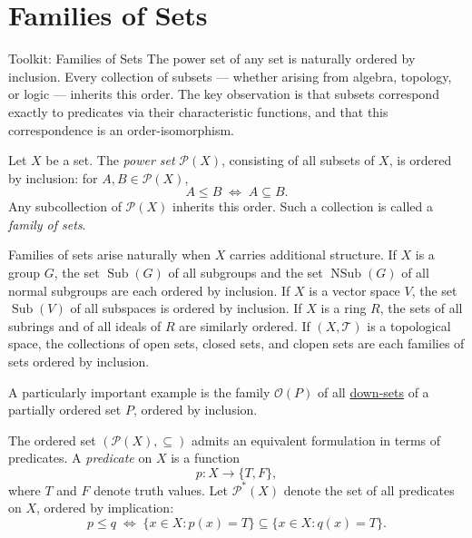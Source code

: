 
\section{Families of Sets}
\label{sec:families-of-sets}

\begin{toolkitbox}{Toolkit: Families of Sets}
The power set of any set is naturally ordered by inclusion.  Every
collection of subsets — whether arising from algebra, topology, or logic
— inherits this order.  The key observation is that subsets correspond
exactly to predicates via their characteristic functions, and that this
correspondence is an order-isomorphism.
\end{toolkitbox}

Let $X$ be a set.  The \emph{power set} $\mathcal{P}(X)$, consisting of
all subsets of $X$, is ordered by inclusion: for $A, B \in \mathcal{P}(X)$,
\[
A \leq B \;\Longleftrightarrow\; A \subseteq B.
\]
Any subcollection of $\mathcal{P}(X)$ inherits this order.  Such a
collection is called a \emph{family of sets}.

Families of sets arise naturally when $X$ carries additional structure.
If $X$ is a group $G$, the set $\operatorname{Sub}(G)$ of all subgroups
and the set $\operatorname{NSub}(G)$ of all normal subgroups are each
ordered by inclusion.  If $X$ is a vector space $V$, the set
$\operatorname{Sub}(V)$ of all subspaces is ordered by inclusion.  If $X$
is a ring $R$, the sets of all subrings and of all ideals of $R$ are
similarly ordered.  If $(X, \mathcal{T})$ is a topological space, the
collections of open sets, closed sets, and clopen sets are each families
of sets ordered by inclusion.

A particularly important example is the family $\mathcal{O}(P)$ of all
\hyperref[def:down-set]{down-sets} of a partially ordered set $P$,
ordered by inclusion.

\medskip

The ordered set $(\mathcal{P}(X), \subseteq)$ admits an equivalent
formulation in terms of predicates.  A \emph{predicate} on $X$ is a
function
\[
p : X \to \{T, F\},
\]
where $T$ and $F$ denote truth values.  Let $\mathcal{P}^*(X)$ denote
the set of all predicates on $X$, ordered by implication:
\[
p \leq q
\;\Longleftrightarrow\;
\{x \in X : p(x) = T\} \subseteq \{x \in X : q(x) = T\}.
\]

